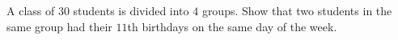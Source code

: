 A class of $30$ students is divided into $4$ groups. Show that two students in the same group had their $11$th birthdays on the same day of the week.
